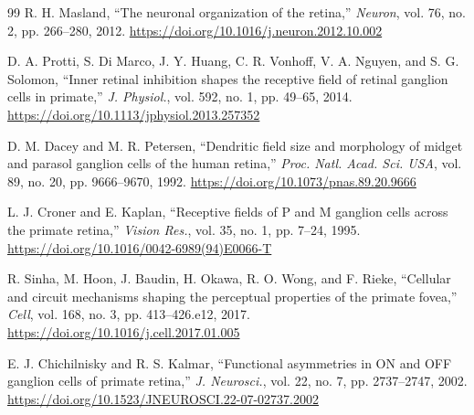 \documentclass[a4paper,10pt,twocolumn,uplatex,dvipdfmx]{jsarticle}
\begin{document}
\begin{thebibliography}{99}
R. H. Masland,
``The neuronal organization of the retina,''
\textit{Neuron}, vol. 76, no. 2, pp. 266--280, 2012.
\url{https://doi.org/10.1016/j.neuron.2012.10.002}

D. A. Protti, S. Di Marco, J. Y. Huang, C. R. Vonhoff,
V. A. Nguyen, and S. G. Solomon,
``Inner retinal inhibition shapes the receptive field of retinal ganglion
cells in primate,''
\textit{J. Physiol.}, vol. 592, no. 1, pp. 49--65, 2014.
\url{https://doi.org/10.1113/jphysiol.2013.257352}

D. M. Dacey and M. R. Petersen,
``Dendritic field size and morphology of midget and parasol ganglion cells
of the human retina,''
\textit{Proc. Natl. Acad. Sci. USA}, vol. 89, no. 20, pp. 9666--9670, 1992.
\url{https://doi.org/10.1073/pnas.89.20.9666}

L. J. Croner and E. Kaplan,
``Receptive fields of P and M ganglion cells across the primate retina,''
\textit{Vision Res.}, vol. 35, no. 1, pp. 7--24, 1995.
\url{https://doi.org/10.1016/0042-6989(94)E0066-T}

R. Sinha, M. Hoon, J. Baudin, H. Okawa, R. O. Wong, and F. Rieke,
``Cellular and circuit mechanisms shaping the perceptual properties of the
primate fovea,''
\textit{Cell}, vol. 168, no. 3, pp. 413--426.e12, 2017.
\url{https://doi.org/10.1016/j.cell.2017.01.005}

E. J. Chichilnisky and R. S. Kalmar,
``Functional asymmetries in ON and OFF ganglion cells of primate retina,''
\textit{J. Neurosci.}, vol. 22, no. 7, pp. 2737--2747, 2002.
\url{https://doi.org/10.1523/JNEUROSCI.22-07-02737.2002}

\end{thebibliography}
\end{document}
